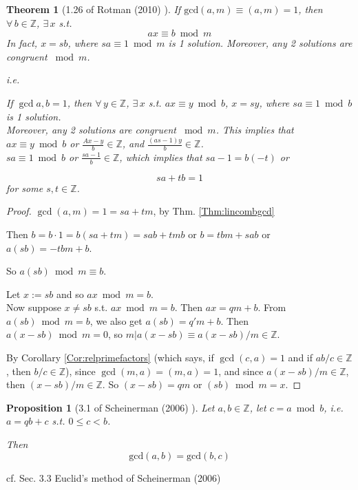 \documentclass[10pt]{amsart}
\newtheorem{theorem}{Theorem}
\newtheorem{proposition}{Proposition}
\begin{document}
\begin{multicols*}{2}
\begin{theorem}[1.26 of Rotman (2010) \cite{JRotman2010}]\label{Thm:relprimeinvertible} 
If $\text{gcd}(a,m) \equiv (a,m) = 1$, then $\forall \, b \in \mathbb{Z}$, $\exists \, x $ s.t. 
\[
ax \equiv b\bmod{m}
\]
In fact, $x=sb$, where $sa\equiv 1\bmod{m}$ is 1 solution.  Moreover, any 2 solutions are congruent $\bmod{m}$.

i.e.  %

If $\gcd{a,b} = 1$, then $\forall \, y \in \mathbb{Z}$, $\exists \, x$ s.t. $ax \equiv y \bmod{b}$, $x=sy$, where $sa\equiv 1\bmod{b}$ is 1 solution.  \\
Moreover, any 2 solutions are congruent $\bmod{m}$.  This implies that    \\

$ax\equiv y \bmod{b}$ or $\frac{Ax-y}{b} \in \mathbb{Z}$, and $\frac{(as-1)y }{b} \in \mathbb{Z}$.  \\
$sa \equiv 1 \bmod{b}$ or $\frac{sa-1}{b} \in \mathbb{Z}$, which implies that $sa-1 = b(-t)$ or 

\[
sa + tb =1
\]
for some $s,t\in \mathbb{Z}$.  
\end{theorem}
\begin{proof}
$\gcd(a,m) = 1=sa+tm$, by Thm. \ref{Thm:lincombgcd}   

Then $b=b\cdot 1=  b(sa+tm) = sab+tmb$ or $b=tbm+sab$ or $a(sb) = -tbm + b$.  

So $a(sb)\bmod{m}  \equiv b$.  

Let $x:= sb$ and so $ax \bmod{m}=b$.   \\
Now suppose $x \neq sb$ s.t. $ax\bmod{m}=b$.  Then $ax=qm +b$.  From $a(sb) \bmod{m}=b$, we also get $a(sb) = q'm + b$.  Then $a(x-sb) \bmod{m}=0$, so $m|a(x-sb) \equiv a(x-sb)/m\in \mathbb{Z}$.  

By Corollary \ref{Cor:relprimefactors} (which says, if $\gcd(c,a)=1$ and if $ab/c\in\mathbb{Z}$, then $b/c \in \mathbb{Z}$), 
since $\gcd(m,a) = (m,a)=1$, and since $a(x-sb)/m \in \mathbb{Z}$, then $(x-sb)/m\in\mathbb{Z}$.  So $(x-sb)=qm$ or $(sb)\bmod{m} = x$.  


\end{proof}



\begin{proposition}[3.1 of Scheinerman (2006) \cite{Sche2006}]\label{Prop:commongcd}
Let $a,b\in \mathbb{Z}$, let $c=a\bmod{b}$, i.e. $a=qb+c$ s.t. $0\leq c <b$.  

Then 
\begin{equation}
\text{gcd}(a,b) = \text{gcd}(b,c)
\end{equation}
\end{proposition}
cf. Sec. 3.3 Euclid's method of Scheinerman (2006) \cite{Sche2006}


\end{multicols*}
\end{document}
